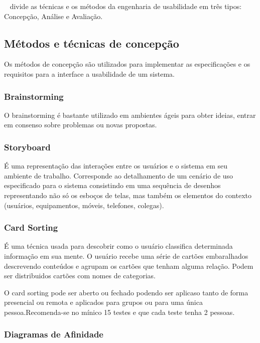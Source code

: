	~ divide as técnicas e os métodos da engenharia de usabilidade em três tipos: Concepção, Análise e Avaliação.

\subsection{Métodos e técnicas de concepção}

Os métodos de concepção são utilizados para implementar as especificações e os requisitos para a interface a usabilidade de um sistema.

\subsubsection{Brainstorming}

	O brainstorming é bastante utilizado em ambientes ágeis para obter ideias, entrar em consenso sobre problemas ou novas propostas.

\subsubsection{Storyboard}

É uma representação das interações entre os usuários e o sistema em seu ambiente de trabalho. Corresponde ao detalhamento de um cenário de uso especificado para o sistema consistindo em uma sequência de desenhos representando não só os esboços de telas, mas também os elementos do contexto (usuários, equipamentos, móveis, telefones, colegas).

\subsubsection{Card Sorting}

	É uma técnica usada para descobrir como o usuário classifica determinada informação em sua mente. O usuário recebe uma série de cartões embaralhados descrevendo conteúdos e agrupam os cartões que tenham alguma relação. Podem ser distribuidos cartões com nomes de categorias.
	
	O card sorting pode ser aberto ou fechado podendo ser aplicaso tanto de forma presencial ou remota e aplicados para grupos ou para uma única pessoa.Recomenda-se no mínico 15 testes e que cada teste tenha 2 pessoas.
	
\subsubsection{Diagramas de Afinidade}

